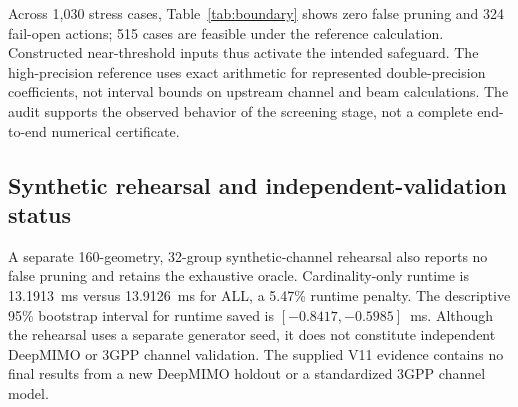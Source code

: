 Across 1,030 stress cases, Table~\ref{tab:boundary} shows zero false pruning and 324 fail-open actions; 515 cases are feasible under the reference calculation. Constructed near-threshold inputs thus activate the intended safeguard. The high-precision reference uses exact arithmetic for represented double-precision coefficients, not interval bounds on upstream channel and beam calculations. The audit supports the observed behavior of the screening stage, not a complete end-to-end numerical certificate.

\subsection{Synthetic rehearsal and independent-validation status}
A separate 160-geometry, 32-group synthetic-channel rehearsal also reports no false pruning and retains the exhaustive oracle. Cardinality-only runtime is 13.1913~ms versus 13.9126~ms for ALL, a 5.47\% runtime penalty. The descriptive 95\% bootstrap interval for runtime saved is $[-0.8417,-0.5985]$~ms. Although the rehearsal uses a separate generator seed, it does not constitute independent DeepMIMO or 3GPP channel validation. The supplied V11 evidence contains no final results from a new DeepMIMO holdout or a standardized 3GPP channel model.
